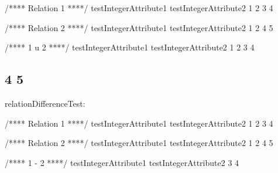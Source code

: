 \begin{DoxyPre}{\ttfamily /**** Relation 1 ****/
testIntegerAttribute1  testIntegerAttribute2  
1                      2                      
3                      4}\end{DoxyPre}



\begin{DoxyPre}{\ttfamily /**** Relation 2 ****/
testIntegerAttribute1  testIntegerAttribute2  
1                      2                      
4                      5}\end{DoxyPre}



\begin{DoxyPre}{\ttfamily /**** 1 u 2 ****/
testIntegerAttribute1  testIntegerAttribute2  
1                      2                      
3                      4                      
\subsection*{4                      5                      
}}\end{DoxyPre}



\begin{DoxyPre}{\ttfamily }\end{DoxyPre}



\begin{DoxyPre}{\ttfamily relationDifferenceTest:}\end{DoxyPre}



\begin{DoxyPre}{\ttfamily /**** Relation 1 ****/
testIntegerAttribute1  testIntegerAttribute2  
1                      2                      
3                      4}\end{DoxyPre}



\begin{DoxyPre}{\ttfamily /**** Relation 2 ****/
testIntegerAttribute1  testIntegerAttribute2  
1                      2                      
4                      5}\end{DoxyPre}



\begin{DoxyPre}{\ttfamily /**** 1 - 2 ****/
testIntegerAttribute1  testIntegerAttribute2  
3                      4}\end{DoxyPre}



